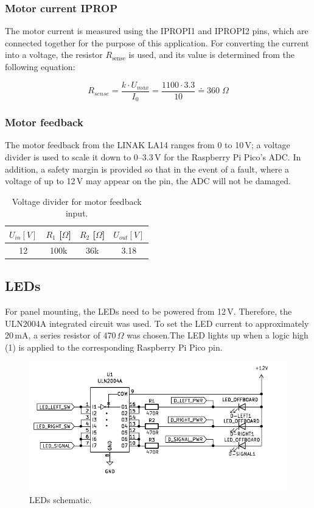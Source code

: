 \subsubsection{Motor current IPROP}
The motor current is measured using the IPROPI1 and IPROPI2 pins, which are connected together for the purpose of this application. For converting the current into a voltage, the resistor $R_{\text{sense}}$ is used, and its value is determined from the following equation:

 \begin{equation}
	\label{r_sense}
    R_{sense}= \frac{k\cdot U_{max}}{I_0}=\frac{1100 \cdot 3.3}{10} \doteq 360 \; \Omega
\end{equation}

\subsubsection{Motor feedback}
The motor feedback from the LINAK LA14 ranges from 0 to 10\,V; a voltage divider is used to scale it down to 0–3.3\,V for the Raspberry Pi Pico's ADC. In addition, a safety margin is provided so that in the event of a fault, where a voltage of up to 12\,V may appear on the pin, the ADC will not be damaged.
\begin{table}[h!]
\centering
\begin{tabular}{|c|c|c|c|}
\hline
{$U_{in} [V]$} & {$R_1$ [$\Omega$]} & {$R_2$ [$\Omega$]} & {$U_{out} [V]$} \\ \hline
12 & 100k & 36k & 3.18 \\ \hline
\end{tabular}
\caption{Voltage divider for motor feedback input.}
\label{tab:voltage_divider}
\end{table}

\subsection{LEDs}
For panel mounting, the LEDs need to be powered from 12\,V. Therefore, the ULN2004A integrated circuit was used. To set the LED current to approximately 20\,mA, a series resistor of 470\,$\Omega$ was chosen.The LED lights up when a logic high (1) is applied to the corresponding Raspberry Pi Pico pin.

\begin{figure}[h!]
    \centering
    \includegraphics[width=\textwidth]{images/leds_wiring.pdf}
    \caption{LEDs schematic.}
    \label{fig:leds_schematic}
\end{figure}

